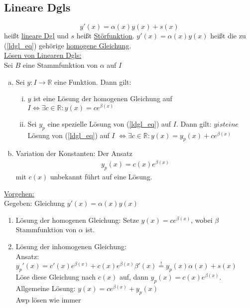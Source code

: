 \documentclass{article}
\begin{document}
\subsection{Lineare Dgls}
\begin{equation} \label{ldgl_eq}
    y'(x) = \alpha(x) y(x) + s(x) 
\end{equation}
heißt \underline{lineare Dgl} und $s$ heißt \underline{Störfunktion}. $y'(x)=\alpha(x)y(x)$ heißt die zu (\ref{ldgl_eq}) gehörige \underline{homogene Gleichung}. \\
\underline{Lösen von Linearen Dgls:} \\
Sei $B$ eine Stammfunktion von $\alpha$ auf $I$
\begin{enumerate} [a)]
    \item Sei $y: I \to \mathbb{R}$ eine Funktion. Dann gilt:
    \begin{enumerate} [i)]
        \item $y$ ist eine Lösung der homogenen Gleichung auf $I \Leftrightarrow \exists c \in \mathbb{R}: y(x) = ce^{\beta(x)}$
        \item Sei $y_p$ eine spezielle Lösung von (\ref{ldgl_eq}) auf $I$. Dann gilt: $y ist eine$ Lösung von (\ref{ldgl_eq}) auf $I$
        $\Leftrightarrow \exists c \in \mathbb{R}: y(x) = y_p(x) + ce^{\beta(x)}$
    \end{enumerate}
    \item Variation der Konstanten: Der Ansatz 
    \begin{align*}
        y_p(x) = c(x)e^{\beta(x)}
    \end{align*}
    mit $c(x)$ unbekannt führt auf eine Lösung.
\end{enumerate}
\underline{Vorgehen:} \\
Gegeben: Gleichung $y'(x) = \alpha(x)y(x)$
\begin{enumerate}
    \item Lösung der homogenen Gleichung: Setze $y(x) = ce^{\beta(x)}$, wobei $\beta$ Stammfunktion von $\alpha$ ist.
    \item Lösung der inhomogenen Gleichung: \\
    Ansatz: $y_p'(x) = c'(x)e^{\beta(x)} + c(x) e^{\beta(x)}\beta'(x) \stackrel{\text{!}}{=} y_p(x)\alpha(x) + s(x)$ \\
    Löse diese Gleichung nach $c(x)$ auf, dann $y_p(x) = c(x)e^{\beta(x)}$. Allgemeine Lösung: $y(x)=ce^{\beta(x)} + y_p(x)$ \\
    Awp lösen wie immer
\end{enumerate}
\end{document}

